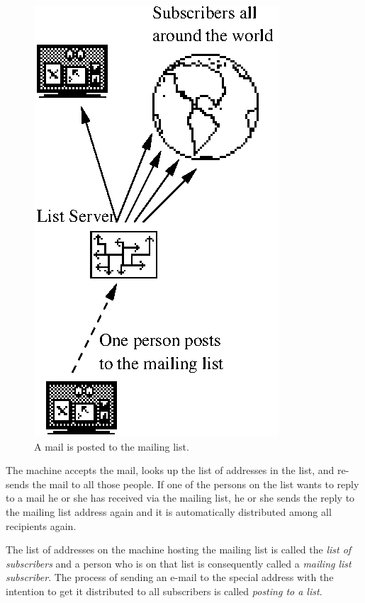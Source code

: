 \documentclass[a4paper,10pt]{scrreprt}
\newcommand{\Def}[1]{{\sl #1}}
\begin{document}
\begin{figure}[bth]
\begin{center}
\includegraphics{ml-principle1.eps}
\caption{A mail is posted to the mailing list.}
\end{center}
\end{figure}

The machine accepts the mail, looks up the list of addresses in the
list, and re-sends the mail to all those people. If one of the persons
on the list wants to reply to a mail he or she has received via the
mailing list, he or she sends the reply to the mailing list address
again and it is automatically distributed among all recipients again.

The list of addresses on the machine hosting the mailing list is
called the \Def{list of subscribers} and a person who is on that list
is consequently called a \Def{mailing list subscriber}. The process of
sending an e-mail to the special address with the intention to get it
distributed to all subscribers is called \Def{posting to a list}.
\end{document}
